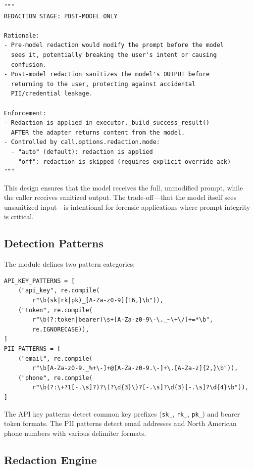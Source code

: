 \documentclass[11pt,a4paper]{article}
\theoremstyle{plain}
\theoremstyle{definition}
\begin{document}
\begin{lstlisting}[style=pythonstyle, caption={Redaction design rationale from \texttt{redaction.py}}]
"""
REDACTION STAGE: POST-MODEL ONLY

Rationale:
- Pre-model redaction would modify the prompt before the model
  sees it, potentially breaking the user's intent or causing
  confusion.
- Post-model redaction sanitizes the model's OUTPUT before
  returning to the user, protecting against accidental
  PII/credential leakage.

Enforcement:
- Redaction is applied in executor._build_success_result()
  AFTER the adapter returns content from the model.
- Controlled by call.options.redaction.mode:
  - "auto" (default): redaction is applied
  - "off": redaction is skipped (requires explicit override ack)
"""
\end{lstlisting}

This design ensures that the model receives the full, unmodified prompt, while
the caller receives sanitized output. The trade-off---that the model itself sees
unsanitized input---is intentional for forensic applications where prompt
integrity is critical.

\subsection{Detection Patterns}

The module defines two pattern categories:

\begin{lstlisting}[style=pythonstyle, caption={Redaction patterns from \texttt{redaction.py}}]
API_KEY_PATTERNS = [
    ("api_key", re.compile(
        r"\b(sk|rk|pk)_[A-Za-z0-9]{16,}\b")),
    ("token", re.compile(
        r"\b(?:token|bearer)\s+[A-Za-z0-9\-\._~\+\/]+=*\b",
        re.IGNORECASE)),
]
PII_PATTERNS = [
    ("email", re.compile(
        r"\b[A-Za-z0-9._%+\-]+@[A-Za-z0-9.\-]+\.[A-Za-z]{2,}\b")),
    ("phone", re.compile(
        r"\b(?:\+?1[-.\s]?)?\(?\d{3}\)?[-.\s]?\d{3}[-.\s]?\d{4}\b")),
]
\end{lstlisting}

The API key patterns detect common key prefixes (\texttt{sk\_}, \texttt{rk\_},
\texttt{pk\_}) and bearer token formats. The PII patterns detect email addresses
and North American phone numbers with various delimiter formats.

\subsection{Redaction Engine}
\end{document}

